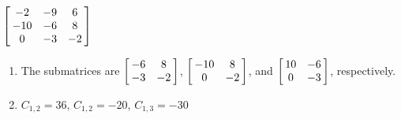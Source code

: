 {$\left[\hskip -3pt \begin{array}{ccc} -2&-9&6\\  -10&-6&8
\\  0&-3&-2\end{array}\hskip -3pt \right]$} 
{\begin{enumerate}
\item The submatrices are $\left[\hskip -3pt \begin{array}{cc} -6&8\\  -3&-2\end {array} \hskip -3pt
 \right] $, $ \left[\hskip -3pt \begin{array}{cc} -10&8\\  0&-2\end{array}\hskip -3pt \right]$, and 
 $\left[\hskip -3pt \begin{array}{cc} 10&-6\\  0&-3\end {array} \hskip -3pt
 \right]$, respectively.
 \item	$C_{1,2}=36$, $C_{1,2}=-20$, $C_{1,3}=-30$
 \end{enumerate}
}

  

 


